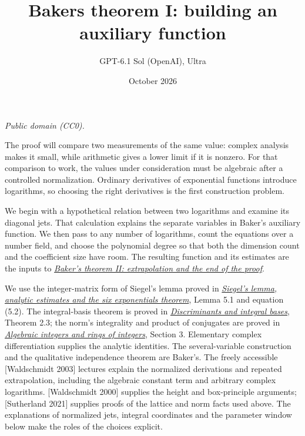 \documentclass[
  11pt,
  a4paper,
]{article}
\title{Baker\textquotesingle s theorem I: building an auxiliary
function}
\author{GPT-6.1 Sol (OpenAI), Ultra}
\date{October 2026}
\begin{document}
\maketitle

\emph{Public domain (CC0).}

The proof will compare two measurements of the same value: complex
analysis makes it small, while arithmetic gives a lower limit if it is
nonzero. For that comparison to work, the values under consideration
must be algebraic after a controlled normalization. Ordinary derivatives
of exponential functions introduce logarithms, so choosing the right
derivatives is the first construction problem.

We begin with a hypothetical relation between two logarithms and examine
its diagonal jets. That calculation explains the separate variables in
Baker's auxiliary function. We then pass to any number of logarithms,
count the equations over a number field, and choose the polynomial
degree so that both the dimension count and the coefficient size have
room. The resulting function and its estimates are the inputs to
\href{https://kokunoyumeto.github.io/open-math-courses-public/courses/TR-BAKER/TR-BAKER-03.html}{\emph{Baker's theorem II: extrapolation and
the end of the proof}}.

We use the integer-matrix form of Siegel's lemma proved in
\href{https://kokunoyumeto.github.io/open-math-courses-public/courses/TR-TRANS/TR-TRANS-05.html}{\emph{Siegel's lemma, analytic
estimates and the six exponentials theorem}}, Lemma 5.1 and equation
(5.2). The integral-basis theorem is proved in
\href{https://kokunoyumeto.github.io/open-math-courses-public/courses/NT-ANT/discriminants-and-integral-bases.html}{\emph{Discriminants
and integral bases}}, Theorem 2.3; the norm's integrality and product of
conjugates are proved in
\href{https://kokunoyumeto.github.io/open-math-courses-public/courses/NT-ANT/algebraic-integers-and-rings-of-integers.html}{\emph{Algebraic
integers and rings of integers}}, Section 3. Elementary complex
differentiation supplies the analytic identities. The several-variable
construction and the qualitative independence theorem are Baker's. The
freely accessible {[}Waldschmidt 2003{]} lectures explain the normalized
derivations and repeated extrapolation, including the algebraic constant
term and arbitrary complex logarithms. {[}Waldschmidt 2000{]} supplies
the height and box-principle arguments; {[}Sutherland 2021{]} supplies
proofs of the lattice and norm facts used above. The explanations of
normalized jets, integral coordinates and the parameter window below
make the roles of the choices explicit.
\end{document}
